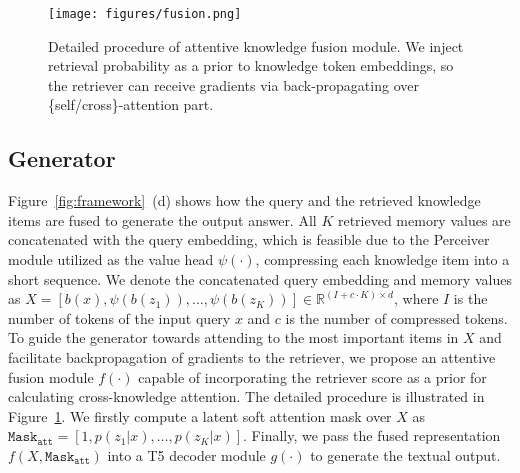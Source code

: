 \documentclass[10pt,twocolumn,letterpaper]{article}
\begin{document}
\begin{figure}[t!]
    \centering
    \texttt{[image: figures/fusion.png]}
        \vspace{-.2in}
    \caption{Detailed procedure of attentive knowledge fusion module. We inject retrieval probability as a prior to knowledge token embeddings, so the retriever can receive gradients via back-propagating over \{self/cross\}-attention part.}
    \label{fig:fusion}
\end{figure}



\subsection{Generator} \label{sec:generation}

Figure~\ref{fig:framework}~(d) shows how the query and the retrieved knowledge items are fused to generate the output answer.
All $K$ retrieved memory values are concatenated with the query embedding, which is feasible due to the Perceiver module utilized as the value head $\psi(\cdot)$, compressing each knowledge item into a short sequence. We denote the concatenated query embedding and memory values as $X = [b(x), \psi(b(z_1)), \dots, \psi(b(z_K))] \in \mathbb{R}^{(I + c \cdot K) \times d}$, where $I$ is the number of tokens of the input query $x$ and $c$ is the number of compressed tokens. To guide the generator towards attending to the most important items in $X$ and facilitate backpropagation of gradients to the retriever, we propose an attentive fusion module $f(\cdot)$ capable of incorporating the retriever score as a prior for calculating cross-knowledge attention. The detailed procedure is illustrated in Figure~\ref{fig:fusion}. We firstly 
compute a latent soft attention mask over $X$ as $\texttt{Mask}_{\texttt{att}} = [1,p(z_1|x), \dots, p(z_K|x)]$.
Finally, we pass the fused representation $f(X, \texttt{Mask}_{\texttt{att}})$ into a T5 decoder module $g(\cdot)$ to generate the textual output.
\end{document}
